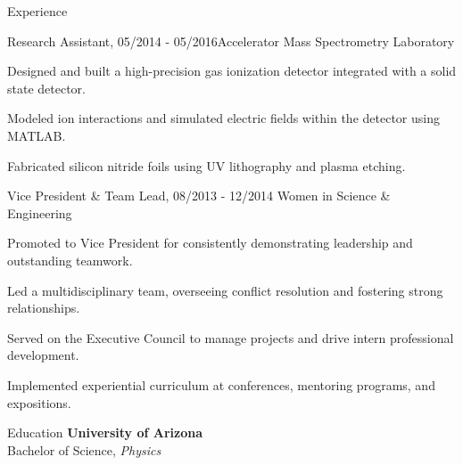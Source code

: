\documentclass{resume} %
\begin{document}
\begin{rSection}{Experience}

\begin{rSubsection}{Research Assistant,} {05/2014 - 05/2016}{Accelerator Mass Spectrometry Laboratory}
\item Designed and built a high-precision gas ionization detector integrated with a solid state detector. 
\item Modeled ion interactions and simulated electric fields within the detector using MATLAB. 
\item Fabricated silicon nitride foils using UV lithography and plasma etching. 
\end{rSubsection}

\begin{rSubsection} {Vice President \& Team Lead,} {08/2013 - 12/2014} {Women in Science \& Engineering} 
\item  Promoted to Vice President for consistently demonstrating leadership and outstanding teamwork. 
\item  Led a multidisciplinary team, overseeing conflict resolution and fostering strong relationships.
\item  Served on the Executive Council to manage projects and drive intern professional development. 
\item Implemented experiential curriculum at conferences, mentoring programs, and expositions. 
\end{rSubsection}
\end{rSection}



\begin{rSection}{Education}
	{\bf University of Arizona} \\ 
	{Bachelor of Science, {\em Physics}}\\
\end{rSection}
\end{document}
